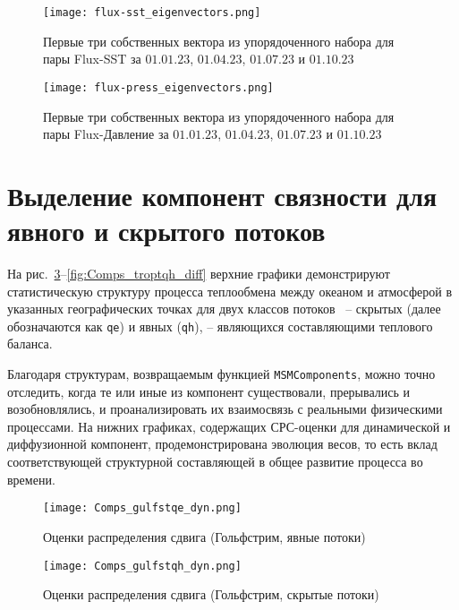 \begin{figure}
	\centering
	\texttt{[image: flux-sst\_eigenvectors.png]}
	\caption{Первые три собственных вектора из упорядоченного набора для пары Flux-SST за $01.01.23$, $01.04.23$, $01.07.23$ и $01.10.23$}
	\label{fig:Flux-SST_eigenvectors}
\end{figure}

\begin{figure}
	\centering
	\texttt{[image: flux-press\_eigenvectors.png]}
	\caption{Первые три собственных вектора из упорядоченного набора для пары Flux-Давление за $01.01.23$, $01.04.23$, $01.07.23$ и $01.10.23$}
	\label{fig:Flux-press_eigenvectors}
\end{figure}

\section{Выделение компонент связности для явного и скрытого потоков}
На рис.~\ref{fig:Comps_gulfstqe_dyn}--\ref{fig:Comps_troptqh_diff} верхние графики демонстрируют статистическую структуру процесса теплообмена между океаном и атмосферой в указанных географических точках для двух классов потоков~\cite{perry1977ocean} --  скрытых (далее обозначаются как \verb"qe") и явных (\verb"qh"), -- являющихся составляющими теплового баланса.

Благодаря структурам, возвращаемым функцией \verb"MSMComponents", можно точно отследить, когда те или иные из компонент существовали, прерывались и возобновлялись, и проанализировать их взаимосвязь с реальными физическими процессами. На нижних графиках, содержащих СРС-оценки для динамической и диффузионной компонент, продемонстрирована эволюция весов, то есть вклад соответствующей структурной составляющей в общее развитие процесса во времени.

\begin{figure}[!h]
	\centering
	\texttt{[image: Comps\_gulfstqe\_dyn.png]}
	\caption{Оценки распределения сдвига (Гольфстрим, явные потоки)}
	\label{fig:Comps_gulfstqe_dyn}
\end{figure}

\begin{figure}[!h]
	\centering
	\texttt{[image: Comps\_gulfstqh\_dyn.png]}
	\caption{Оценки распределения сдвига (Гольфстрим, скрытые потоки)}
	\label{fig:Comps_gulfstqh_dyn}
\end{figure}


